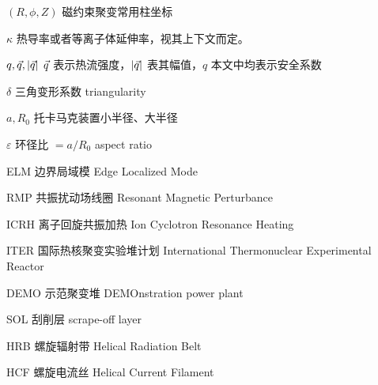 \begin{denotation}[3cm]
\item[$(R, \phi, Z)$] 磁约束聚变常用柱坐标
\item[$\kappa$] 热导率或者等离子体延伸率，视其上下文而定。
\item[$q, \vec{q}, |\vec{q}|$] $\vec{q}$ 表示热流强度，$|\vec{q}|$ 表其幅值，$q$ 本文中均表示安全系数
\item[$\delta$] 三角变形系数 triangularity
\item[$a, R_0$] 托卡马克装置小半径、大半径  
\item[$\varepsilon$] 环径比 $=a/R_0$ aspect ratio 
\item[ELM] 边界局域模 Edge Localized Mode
\item[RMP] 共振扰动场线圈 Resonant Magnetic Perturbance
\item[ICRH] 离子回旋共振加热 Ion Cyclotron Resonance Heating  
\item[ITER] 国际热核聚变实验堆计划 International Thermonuclear Experimental Reactor 
\item[DEMO] 示范聚变堆 DEMOnstration power plant
\item[SOL] 刮削层 scrape-off layer
\item[HRB] 螺旋辐射带 Helical Radiation Belt  
\item[HCF] 螺旋电流丝 Helical Current Filament
\end{denotation}





